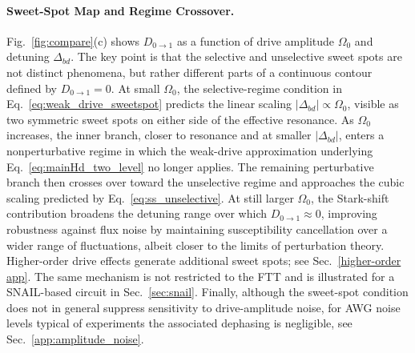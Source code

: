 \paragraph{Sweet-Spot Map and Regime Crossover.}
Fig.~\ref{fig:compare}(c) shows \(D_{0\rightarrow 1}\) as a function of drive amplitude \(\Omega_0\) and detuning \(\Delta_{bd}\). The key point is that the selective and unselective sweet spots are not distinct phenomena, but rather different parts of a continuous contour defined by \(D_{0\rightarrow 1}=0\). At small \(\Omega_0\), the selective-regime condition in Eq.~\eqref{eq:weak_drive_sweetspot} predicts the linear scaling \(|\Delta_{bd}| \propto \Omega_0\), visible as two symmetric sweet spots on either side of the effective resonance. As \(\Omega_0\) increases, the inner branch, closer to resonance and at smaller \(|\Delta_{bd}|\), enters a nonperturbative regime in which the weak-drive approximation underlying Eq.~\eqref{eq:mainHd_two_level} no longer applies. The remaining perturbative branch then crosses over toward the unselective regime and approaches the cubic scaling predicted by Eq.~\eqref{eq:ss_unselective}. At still larger \(\Omega_0\), the Stark-shift contribution broadens the detuning range over which \(D_{0\rightarrow 1}\approx 0\), improving robustness against flux noise by maintaining susceptibility cancellation over a wider range of fluctuations, albeit closer to the limits of perturbation theory. Higher-order drive effects generate additional sweet spots; see Sec.~\ref{higher-order app}. The same mechanism is not restricted to the FTT and is illustrated for a SNAIL-based circuit in Sec.~\ref{sec:snail}. Finally, although the sweet-spot condition does not in general suppress sensitivity to drive-amplitude noise, for AWG noise levels typical of experiments the associated dephasing is negligible, see Sec.~\ref{app:amplitude_noise}.

